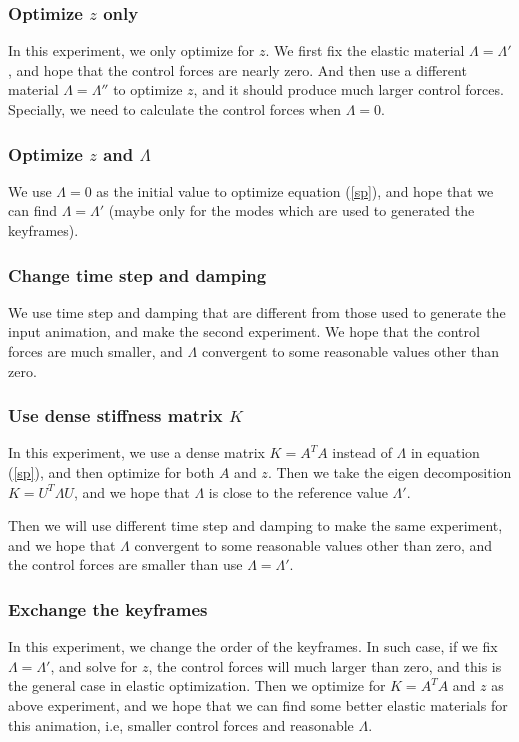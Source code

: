 \documentclass[9pt,twocolumn]{extarticle}
\begin{document}
\subsubsection{Optimize $z$ only}
In this experiment, we only optimize for $z$. We first fix the elastic material
$\Lambda = \Lambda'$, and hope that the control forces are nearly zero. And then
use a different material $\Lambda=\Lambda''$ to optimize $z$, and it should
produce much larger control forces. Specially, we need to calculate the control
forces when $\Lambda= 0$.

\subsubsection{Optimize $z$ and $\Lambda$}
We use $\Lambda=0$ as the initial value to optimize equation (\ref{sp}), and
hope that we can find $\Lambda=\Lambda'$ (maybe only for the modes which are
used to generated the keyframes).

\subsubsection{Change time step and damping}
We use time step and damping that are different from those used to generate the
input animation, and make the second experiment. We hope that the control forces
are much smaller, and $\Lambda$ convergent to some reasonable values other
than zero.

\subsubsection{Use dense stiffness matrix $K$}
In this experiment, we use a dense matrix $K=A^TA$ instead of $\Lambda$ in
equation (\ref{sp}), and then optimize for both $A$ and $z$. Then we take the
eigen decomposition $K = U^T\Lambda U$, and we hope that $\Lambda$ is close to
the reference value $\Lambda'$.

Then we will use different time step and damping to make the same experiment,
and we hope that $\Lambda$ convergent to some reasonable values other than zero,
and the control forces are smaller than use $\Lambda=\Lambda'$.

\subsubsection{Exchange the keyframes}\label{sec:exchange-keyframes}
In this experiment, we change the order of the keyframes. In such case, if we
fix $\Lambda = \Lambda'$, and solve for $z$, the control forces will much larger
than zero, and this is the general case in elastic optimization. Then we
optimize for $K=A^TA$ and $z$ as above experiment, and we hope that we can find
some better elastic materials for this animation, i.e, smaller control forces
and reasonable $\Lambda$.
\end{document}
